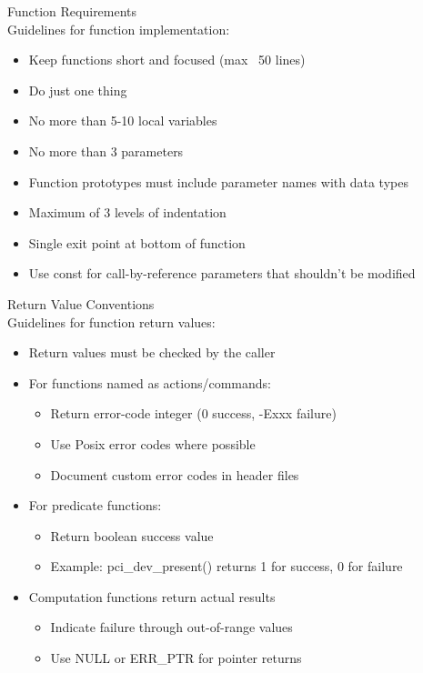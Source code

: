 \begin{definition}{Function Requirements}\\
Guidelines for function implementation:
\begin{itemize}
  \item Keep functions short and focused (max ~50 lines)
  \item Do just one thing
  \item No more than 5-10 local variables
  \item No more than 3 parameters
  \item Function prototypes must include parameter names with data types
  \item Maximum of 3 levels of indentation
  \item Single exit point at bottom of function
  \item Use const for call-by-reference parameters that shouldn't be modified
\end{itemize}
\end{definition}

\begin{concept}{Return Value Conventions}\\
Guidelines for function return values:
\begin{itemize}
  \item Return values must be checked by the caller
  \item For functions named as actions/commands:
    \begin{itemize}
      \item Return error-code integer (0 success, -Exxx failure)
      \item Use Posix error codes where possible
      \item Document custom error codes in header files
    \end{itemize}
  \item For predicate functions:
    \begin{itemize}
      \item Return boolean success value
      \item Example: pci\_dev\_present() returns 1 for success, 0 for failure
    \end{itemize}
  \item Computation functions return actual results
    \begin{itemize}
      \item Indicate failure through out-of-range values
      \item Use NULL or ERR\_PTR for pointer returns
    \end{itemize}
\end{itemize}
\end{concept}

